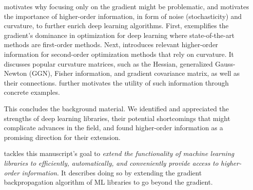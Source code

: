  motivates why focusing only on the gradient
might be problematic, and motivates the importance of higher-order information,
\eg in form of noise (stochasticity) and curvature, to further enrich deep
learning algorithms. First,  exemplifies
the gradient's dominance in optimization for deep learning where
state-of-the-art methods are first-order methods. Next,
 introduces relevant higher-order
information for second-order optimization methods that rely on curvature. It
discusses popular curvature matrices, such as the Hessian, generalized
Gauss-Newton (GGN), Fisher information, and gradient covariance matrix, as well
as their connections.  further motivates
the utility of such information through concrete examples.

This concludes the background material. We identified and appreciated the
strengths of deep learning libraries, their potential shortcomings that might
complicate advances in the field, and found higher-order information as a
promising direction for their extension.

 tackles this manuscript's goal to \emph{extend
  the functionality of machine learning libraries to efficiently, automatically,
  and conveniently provide access to higher-order information}. It describes
doing so by extending the gradient backpropagation algorithm of ML libraries to
go beyond the gradient.

